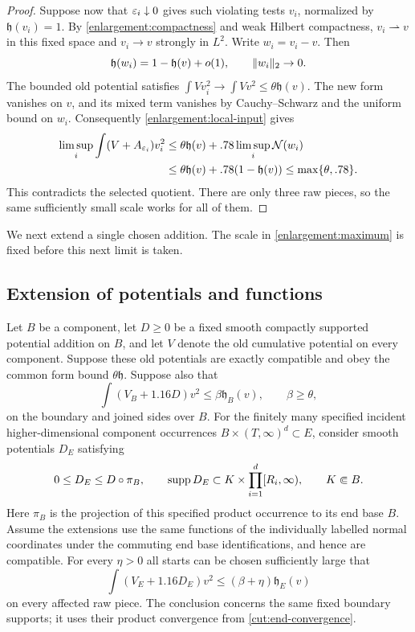 \begin{proof}
Suppose now that $\varepsilon_i\downarrow0$ gives such violating tests $v_i$,
normalized by $\mathfrak h(v_i)=1$.  By \cref{enlargement:compactness} and
weak Hilbert compactness, $v_i\rightharpoonup v$ in this fixed space and
$v_i\to v$ strongly in $L^2$.  Write $w_i=v_i-v$.  Then
\[
 \mathfrak h(w_i)=1-\mathfrak h(v)+o(1),\qquad \lVert w_i\rVert_2\to0.
\]
The bounded old potential satisfies
$\int Vv_i^2\to\int Vv^2\le\theta\mathfrak h(v)$.  The new form
vanishes on $v$, and its mixed term vanishes by Cauchy--Schwarz and the
uniform bound on $w_i$.  Consequently \cref{enlargement:local-input} gives
\begin{align*}
 \limsup_i\int(V+A_{\varepsilon_i})v_i^2
 &\le\theta\mathfrak h(v)+.78\limsup_i\mathcal N(w_i)\\
 &\le\theta\mathfrak h(v)+.78(1-\mathfrak h(v))
 \le\max\{\theta,.78\}.
\end{align*}
This contradicts the selected quotient.  There are only three raw
pieces, so the same sufficiently small scale works for all of them.
\end{proof}

We next extend a single chosen addition.  The scale in
\cref{enlargement:maximum} is fixed before this next limit is taken.

\subsection{Extension of potentials and functions}

\begin{lemma}\label{enlargement:extension}
Let $B$ be a component, let $D\ge0$ be a fixed smooth compactly supported
potential addition on $B$, and let $V$ denote the old cumulative
potential on every component.  Suppose these old potentials are exactly
compatible and obey the common form bound $\theta\mathfrak h$.
Suppose also that
\[
 \int(V_B+1.16D)v^2\le\beta\mathfrak h_B(v),\qquad \beta\ge\theta,
\]
on the boundary and joined sides over $B$.  For the finitely many specified incident higher-dimensional component occurrences
$B\times(T,\infty)^d\subset E$, consider smooth potentials $D_E$
satisfying
\begin{equation}\label{enlargement:extension-support}
 0\le D_E\le D\circ\pi_B,\qquad
 \operatorname{supp} D_E\subset K\times\prod_{i=1}^d[R_i,\infty),
 \qquad K\Subset B.
\end{equation}
Here $\pi_B$ is the projection of this specified product occurrence
to its end base $B$.
Assume the extensions use the same functions of the individually
labelled normal coordinates under the commuting end base identifications,
and hence are compatible.
For every $\eta>0$ all starts can be chosen sufficiently large that
\begin{equation}\label{enlargement:extended-bound}
 \int(V_E+1.16D_E)v^2\le(\beta+\eta)\mathfrak h_E(v)
\end{equation}
on every affected raw piece.  The conclusion concerns the same fixed
boundary supports; it uses their product convergence from
\cref{cut:end-convergence}.
\end{lemma}

